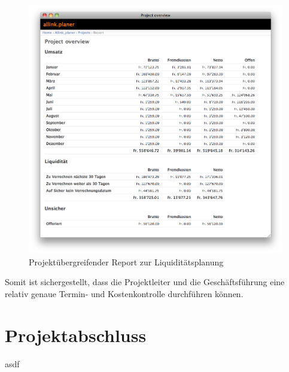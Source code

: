 \begin{figure}[htbp]
\begin{center}
\includegraphics[width=1.0\textwidth,angle=0]{./bilder/proof_of_concept/allink_planer_liq.png}
\caption[Projektübergreifender Report zur Liquiditätsplanung]{Projektübergreifender 
    Report zur Liquiditätsplanung\footnotemark}
\label{pic:allink_planer_liq}
\end{center}
\end{figure}

Somit ist sichergestellt, dass die Projektleiter und die Geschäftsführung eine
relativ genaue Termin- und Kostenkontrolle durchführen können.

\section{Projektabschluss}
asdf